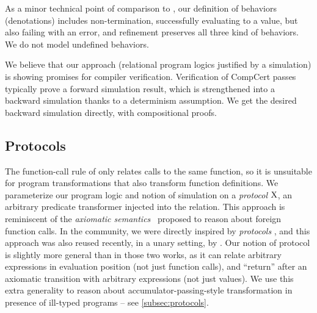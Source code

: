 As a minor technical point of comparison to \Simuliris, our definition of behaviors (denotations) includes non-termination, successfully evaluating to a value, but also failing with an error, and refinement preserves all three kind of behaviors. We do not model undefined behaviors.

We believe that our approach (relational program logics justified by a simulation) is showing promises for compiler verification. Verification of CompCert passes typically prove a forward simulation result, which is strengthened into a backward simulation thanks to a determinism assumption. We get the desired backward simulation directly, with compositional proofs.

\subsection{Protocols}

The function-call rule of \Simuliris only relates calls to the same function, so it is unsuitable for program transformations that also transform function definitions. We parameterize our program logic and notion of simulation on a \emph{protocol} $\mathrm{X}$, an arbitrary predicate transformer injected into the relation. This approach is reminiscent of the \emph{axiomatic semantics}~\citep*{axiomatic-semantics-2014} proposed to reason about foreign function calls. In the \Iris community, we were directly inspired by \emph{protocols} \citet*{protocols-2021}, and this approach was also reused recently, in a unary setting, by \citet*{melocoton-2023}. Our notion of protocol is slightly more general than in those two works, as it can relate arbitrary expressions in evaluation position (not just function calls), and ``return'' after an axiomatic transition with arbitrary expressions (not just values). We use this extra generality to reason about accumulator-passing-style transformation in presence of ill-typed programs -- see \cref{subsec:protocols}.

